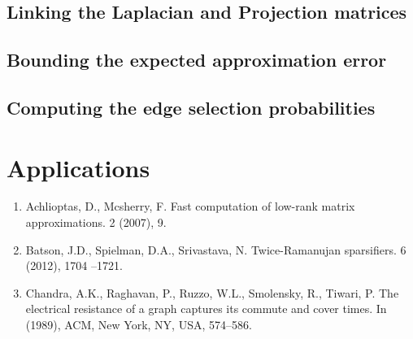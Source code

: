 \documentclass{article}
\begin{document}
\subsection{Linking the Laplacian and Projection matrices}

\subsection{Bounding the expected approximation error}

\subsection{Computing the edge selection probabilities}

\section{Applications}




\begin{enumerate}[1.]
    \item Achlioptas, D., Mcsherry, F. Fast computation of low-rank matrix
        approximations. 2 (2007), 9.

    \item Batson, J.D., Spielman, D.A., Srivastava, N.  Twice-Ramanujan
        sparsifiers. 6 (2012), 1704 –1721.

    \item Chandra, A.K., Raghavan, P., Ruzzo, W.L., Smolensky, R., Tiwari,
        P.  The electrical resistance of a graph captures its commute and
        cover times. In (1989), ACM, New York, NY, USA, 574–586.
\end{enumerate}
\end{document}
